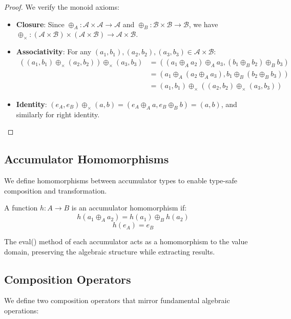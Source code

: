 \documentclass[sigconf]{acmart}
\begin{document}
\begin{proof}
We verify the monoid axioms:
\begin{itemize}
\item \textbf{Closure}: Since $\oplus_A: \mathcal{A} \times \mathcal{A} \rightarrow \mathcal{A}$ and $\oplus_B: \mathcal{B} \times \mathcal{B} \rightarrow \mathcal{B}$, we have $\oplus_{\times}: (\mathcal{A} \times \mathcal{B}) \times (\mathcal{A} \times \mathcal{B}) \rightarrow \mathcal{A} \times \mathcal{B}$.
\item \textbf{Associativity}: For any $(a_1, b_1), (a_2, b_2), (a_3, b_3) \in \mathcal{A} \times \mathcal{B}$:
\begin{align}
((a_1, b_1) \oplus_{\times} (a_2, b_2)) \oplus_{\times} (a_3, b_3) &= ((a_1 \oplus_A a_2) \oplus_A a_3, (b_1 \oplus_B b_2) \oplus_B b_3)\\
&= (a_1 \oplus_A (a_2 \oplus_A a_3), b_1 \oplus_B (b_2 \oplus_B b_3))\\
&= (a_1, b_1) \oplus_{\times} ((a_2, b_2) \oplus_{\times} (a_3, b_3))
\end{align}
\item \textbf{Identity}: $(e_A, e_B) \oplus_{\times} (a, b) = (e_A \oplus_A a, e_B \oplus_B b) = (a, b)$, and similarly for right identity.
\end{itemize}
\end{proof}

\subsection{Accumulator Homomorphisms}

We define homomorphisms between accumulator types to enable type-safe composition and transformation.

\begin{definition}
A function $h: A \rightarrow B$ is an accumulator homomorphism if:
$$h(a_1 \oplus_A a_2) = h(a_1) \oplus_B h(a_2)$$
$$h(e_A) = e_B$$
\end{definition}

The eval() method of each accumulator acts as a homomorphism to the value domain, preserving the algebraic structure while extracting results.

\subsection{Composition Operators}

We define two composition operators that mirror fundamental algebraic operations:
\end{document}
